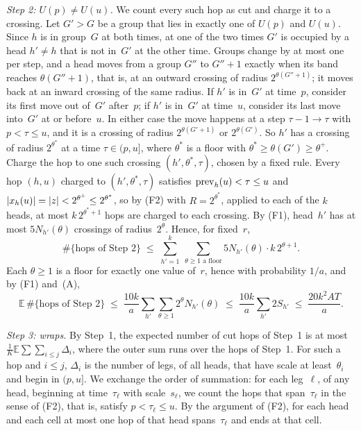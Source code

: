 \begin{informalproof}
\emph{Step 2: $U(p)\ne U(u)$.} We count every such hop as cut and charge it to a crossing. Let $G'>G$ be a group that
lies in exactly one of $U(p)$ and $U(u)$. Since $h$ is in group~$G$ at both times, at one of the two times $G'$ is
occupied by a head $h'\ne h$ that is not in~$G'$ at the other time. Groups change by at most one per step, and a
head moves from a group $G''$ to $G''+1$ exactly when its band reaches $\theta(G''+1)$, that is, at an outward
crossing of radius $2^{\theta(G''+1)}$; it moves back at an inward crossing of the same radius. If $h'$ is in~$G'$
at time~$p$, consider its first move out of~$G'$ after~$p$; if $h'$ is in~$G'$ at time~$u$, consider its last move
into~$G'$ at or before~$u$. In either case the move happens at a step $\tau-1\to\tau$ with $p<\tau\le u$, and it is a
crossing of radius $2^{\theta(G'+1)}$ or $2^{\theta(G')}$. So $h'$ has a crossing of radius $2^{\theta^*}$ at a time
$\tau\in(p,u]$, where $\theta^*$ is a floor with $\theta^*\ge\theta(G')\ge\theta^+$.
Charge the hop to one such crossing $(h',\theta^*,\tau)$, chosen by a fixed rule. Every hop $(h,u)$ charged to
$(h',\theta^*,\tau)$ satisfies $\mathrm{prev}_h(u)<\tau\le u$ and $\lvert x_h(u) \rvert=\lvert z \rvert<2^{\theta^+}\le2^{\theta^*}$, so by
(F2) with $R=2^{\theta^*}$, applied to each of the $k$ heads, at most $k\,2^{\theta^*+1}$ hops are charged to each
crossing. By (F1), head~$h'$ has at most $5N_{h'}(\theta)$ crossings of radius~$2^\theta$. Hence, for fixed~$r$,
\[
  \#\{\text{hops of Step 2}\}\;\le\;\sum_{h'=1}^k\ \sum_{\theta\ge1\text{ a floor}}5N_{h'}(\theta)\cdot k\,2^{\theta+1}.
\]
Each $\theta\ge1$ is a floor for exactly one value of~$r$, hence with probability $1/a$, and by (F1) and~(A),
\[
  \mathbb E\,\#\{\text{hops of Step 2}\}\;\le\;\frac{10k}a\sum_{h'}\sum_{\theta\ge1}2^\theta N_{h'}(\theta)
  \;\le\;\frac{10k}a\sum_{h'}2S_{h'}\;\le\;\frac{20k^2AT}a.
\]

\emph{Step 3: wraps.} By Step~1, the expected number of cut hops of Step~1 is at most
$\frac1K\mathbb E\sum\sum_{i\le j}\Delta_i$, where the outer sum runs over the hops of Step~1. For such a hop and
$i\le j$, $\Delta_i$ is the number of legs, of all heads, that have scale at least~$\theta_i$ and begin in $(p,u]$.
We exchange the order of summation: for each leg~$\ell$, of any head, beginning at time~$\tau_\ell$ with
scale~$s_\ell$, we count the hops that span~$\tau_\ell$ in the sense of (F2), that is, satisfy $p<\tau_\ell\le u$. By the argument
of (F2), for each head and each cell at most one hop of that head spans~$\tau_\ell$ and ends at that cell.


\end{informalproof}
